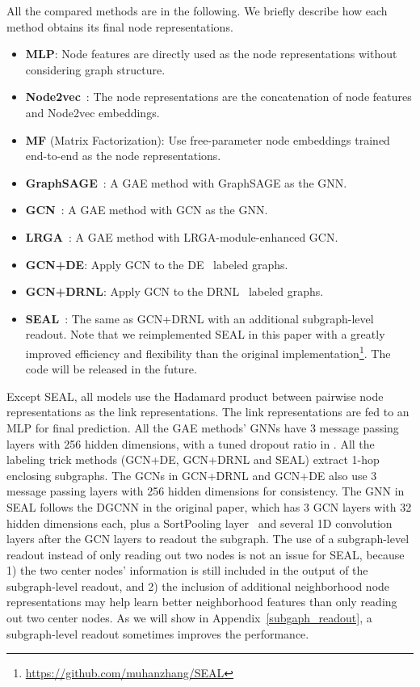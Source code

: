 \documentclass{article}
\begin{document}
All the compared methods are in the following. We briefly describe how each method obtains its final node representations.

\begin{itemize}[leftmargin=15pt,itemsep=-1pt,topsep=-2pt]
\item \textbf{MLP}: Node features are directly used as the node representations without considering graph structure.
\item \textbf{Node2vec}~\citep{perozzi2014deepwalk,grover2016node2vec}: The node representations are the concatenation of node features and Node2vec embeddings.
\item \textbf{MF} (Matrix Factorization): Use free-parameter node embeddings trained end-to-end as the node representations.
\item \textbf{GraphSAGE}~\citep{hamilton2017inductive}: A GAE method with GraphSAGE as the GNN.
\item \textbf{GCN}~\citep{kipf2016variational}: A GAE method with GCN as the GNN.
\item \textbf{LRGA}~\citep{puny2020graph}: A GAE method with LRGA-module-enhanced GCN.
\item \textbf{GCN+DE}: Apply GCN to the DE~\citep{li2020distance} labeled graphs.
\item \textbf{GCN+DRNL}: Apply GCN to the DRNL~\citep{zhang2018link} labeled graphs.
\item \textbf{SEAL}~\citep{zhang2018link}: The same as GCN+DRNL with an additional subgraph-level readout. Note that we reimplemented SEAL in this paper with a greatly improved efficiency and flexibility than the original implementation\footnote{\url{https://github.com/muhanzhang/SEAL}}. The code will be released in the future.
\end{itemize}

Except SEAL, all models use the Hadamard product between pairwise node representations as the link representations. The link representations are fed to an MLP for final prediction. All the GAE methods' GNNs have 3 message passing layers with 256 hidden dimensions, with a tuned dropout ratio in . All the labeling trick methods (GCN+DE, GCN+DRNL and SEAL) extract 1-hop enclosing subgraphs. The GCNs in GCN+DRNL and GCN+DE also use 3 message passing layers with 256 hidden dimensions for consistency. The GNN in SEAL follows the DGCNN in the original paper, which has 3 GCN layers with 32 hidden dimensions each, plus a SortPooling layer~\citep{zhang2018end} and several 1D convolution layers after the GCN layers to readout the subgraph. The use of a subgraph-level readout instead of only reading out two nodes is not an issue for SEAL, because 1) the two center nodes' information is still included in the output of the subgraph-level readout, and 2) the inclusion of additional neighborhood node representations may help learn better neighborhood features than only reading out two center nodes. As we will show in Appendix~\ref{subgaph_readout}, a subgraph-level readout sometimes improves the performance.
\end{document}
